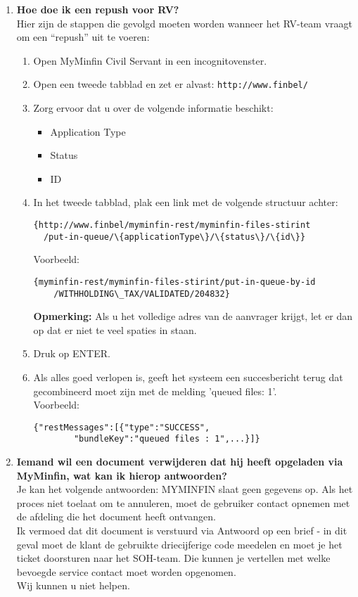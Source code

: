 \begin{enumerate}
    \item \textbf{Hoe doe ik een repush voor RV?} \\
    Hier zijn de stappen die gevolgd moeten worden wanneer het RV-team vraagt om een “repush” uit te voeren:
    \begin{enumerate}
        \item Open MyMinfin Civil Servant in een incognitovenster.
        \item Open een tweede tabblad en zet er alvast: \texttt{http://www.finbel/}
        \item Zorg ervoor dat u over de volgende informatie beschikt:
        \begin{itemize}
            \item Application Type
            \item Status
            \item ID
        \end{itemize}
        \item In het tweede tabblad, plak een link met de volgende structuur achter:\\
      \begin{verbatim}
{http://www.finbel/myminfin-rest/myminfin-files-stirint
  /put-in-queue/\{applicationType\}/\{status\}/\{id\}}
      \end{verbatim}
        Voorbeeld:
        \begin{verbatim}
{myminfin-rest/myminfin-files-stirint/put-in-queue-by-id
    /WITHHOLDING\_TAX/VALIDATED/204832}
        \end{verbatim}
        \textbf{Opmerking:} Als u het volledige adres van de aanvrager krijgt, let er dan op dat er niet te veel spaties in staan.
        \item Druk op ENTER.
        \item Als alles goed verlopen is, geeft het systeem een succesbericht terug dat gecombineerd moet zijn met de melding 'queued files: 1'.\\
        Voorbeeld: 
        \begin{verbatim}
{"restMessages":[{"type":"SUCCESS",
        "bundleKey":"queued files : 1",...}]}
        \end{verbatim}
      \end{enumerate}
        
        \item \textbf{Iemand wil een document verwijderen dat hij heeft opgeladen via MyMinfin, wat kan ik hierop antwoorden?} \\
        Je kan het volgende antwoorden: MYMINFIN slaat geen gegevens op. Als het proces niet toelaat om te annuleren, moet de gebruiker contact opnemen met de afdeling die het document heeft ontvangen.\\
        Ik vermoed dat dit document is verstuurd via Antwoord op een brief - in dit geval moet de klant de gebruikte driecijferige code meedelen en moet je het ticket doorsturen naar het SOH-team. Die kunnen je vertellen met welke bevoegde service contact moet worden opgenomen.\\
        Wij kunnen u niet helpen.
        

\end{enumerate}
